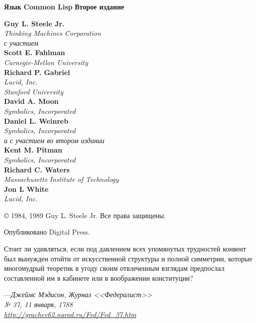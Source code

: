 \else

\begin{titlepage}

\noindent\textbf{Язык}
\noindent\textbf{Common Lisp}
\noindent\textbf{Второе издание}
\begin{flushleft}
\textbf{Guy L. Steele Jr.} \\
\emph{Thinking Machines Corporation} \\
\emph{с участием} \\
\textbf{Scott E. Fahlman} \\
\emph{Carnegie-Mellon University} \\
\textbf{Richard P. Gabriel} \\
\emph{Lucid, Inc.} \\
\emph{Stanford University} \\
\textbf{David A. Moon} \\
\emph{Symbolics, Incorporated} \\
\textbf{Daniel L. Weinreb} \\
\emph{Symbolics, Incorporated} \\
\emph{и с участием во втором издании} \\
\textbf{Kent M. Pitman} \\
\emph{Symbolics, Incorporated} \\
\textbf{Richard C. Waters} \\
\emph{Massachusetts Institute of Technology} \\
\textbf{Jon L White} \\
\emph{Lucid, Inc.}
\end{flushleft}

\begin{center}
\copyright{} 1984, 1989 Guy L. Steele Jr. Все права защищены.
\end{center}
\begin{flushright}
Опубликовано Digital Press.
\end{flushright}

\end{titlepage}

\newpage 

Стоит ли удивляться, если под давлением всех упомянутых трудностей конвент был
вынужден отойти от искусственной структуры и полной симметрии, которые
многомудрый теоретик в угоду своим отвлеченным взглядам предпослал составленной
им в кабинете или в воображении конституции?
\begin{tabbing}
---\=\emph{Джеймс Мэдисон, Журнал <<Федералист>>} \\
\>\emph{№ 37, 11 января, 1788} \\
\>\emph{\href{http://grachev62.narod.ru/Fed/Fed\_37.htm}{http://grachev62.narod.ru/Fed/Fed\_37.htm}}
\end{tabbing}

\fi

